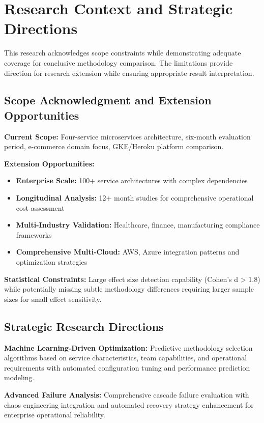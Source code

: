 \section{Research Context and Strategic Directions}
\label{sec:research_context}

This research acknowledges scope constraints while demonstrating adequate coverage for conclusive methodology comparison. The limitations provide direction for research extension while ensuring appropriate result interpretation.

\subsection{Scope Acknowledgment and Extension Opportunities}
\label{subsec:scope_acknowledgment}

\textbf{Current Scope:} Four-service microservices architecture, six-month evaluation period, e-commerce domain focus, GKE/Heroku platform comparison.

\textbf{Extension Opportunities:}
\begin{itemize}
\item \textbf{Enterprise Scale:} 100+ service architectures with complex dependencies
\item \textbf{Longitudinal Analysis:} 12+ month studies for comprehensive operational cost assessment
\item \textbf{Multi-Industry Validation:} Healthcare, finance, manufacturing compliance frameworks
\item \textbf{Comprehensive Multi-Cloud:} AWS, Azure integration patterns and optimization strategies
\end{itemize}

\textbf{Statistical Constraints:} Large effect size detection capability (Cohen's d > 1.8) while potentially missing subtle methodology differences requiring larger sample sizes for small effect sensitivity.

\subsection{Strategic Research Directions}
\label{subsec:strategic_directions}

\textbf{Machine Learning-Driven Optimization:} Predictive methodology selection algorithms based on service characteristics, team capabilities, and operational requirements with automated configuration tuning and performance prediction modeling.

\textbf{Advanced Failure Analysis:} Comprehensive cascade failure evaluation with chaos engineering integration and automated recovery strategy enhancement for enterprise operational reliability.

